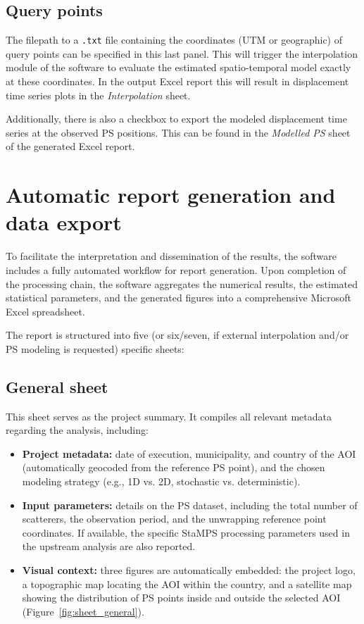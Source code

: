 \subsection{Query points}
The filepath to a \texttt{.txt} file containing the coordinates (UTM or geographic) of query points can be specified in this last panel. This will trigger the interpolation module of the software to evaluate the estimated spatio-temporal model exactly at these coordinates. In the output Excel report this will result in displacement time series plots in the \textit{Interpolation} sheet.

Additionally, there is also a checkbox to export the modeled displacement time series at the observed PS positions. This can be found in the \textit{Modelled PS} sheet of the generated Excel report.




\section{Automatic report generation and data export}
To facilitate the interpretation and dissemination of the results, the software includes a fully automated workflow for report generation. Upon completion of the processing chain, the software aggregates the numerical results, the estimated statistical parameters, and the generated figures into a comprehensive Microsoft Excel spreadsheet.

The report is structured into five (or six/seven, if external interpolation and/or PS modeling is requested) specific sheets:

\subsection{General sheet}
This sheet serves as the project summary. It compiles all relevant metadata regarding the analysis, including:
\begin{itemize}
    \item \textbf{Project metadata:} date of execution, municipality, and country of the AOI (automatically geocoded from the reference PS point), and the chosen modeling strategy (e.g., 1D vs. 2D, stochastic vs. deterministic).
    \item \textbf{Input parameters:} details on the PS dataset, including the total number of scatterers, the observation period, and the unwrapping reference point coordinates. If available, the specific StaMPS processing parameters used in the upstream analysis are also reported.
    \item \textbf{Visual context:} three figures are automatically embedded: the project logo, a topographic map locating the AOI within the country, and a satellite map showing the distribution of PS points inside and outside the selected AOI (Figure~\ref{fig:sheet_general}).
\end{itemize}

